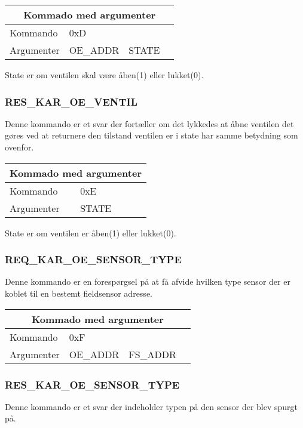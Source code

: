 \begin{table}[H]
\setlength{\parindent}{12pt}
\begin{tabular}{|l|lcc|}
\hline
\multicolumn{4}{|c|}{Kommado med argumenter}\\\hline
Kommando & 0xD & & \\
Argumenter & OE\_ADDR & STATE & \\\hline
\end{tabular}
\end{table}

State er om ventilen skal være åben(1) eller lukket(0).

\subsubsection{RES\_KAR\_OE\_VENTIL}
Denne kommando er et svar der fortæller om det lykkedes at åbne ventilen det gøres ved at returnere den tilstand ventilen er i state har samme betydning som ovenfor.

\begin{table}[H]
\setlength{\parindent}{12pt}
\begin{tabular}{|l|lcc|}
\hline
\multicolumn{4}{|c|}{Kommado med argumenter}\\\hline
Kommando & 0xE & & \\
Argumenter & STATE & & \\\hline
\end{tabular}
\end{table}

State er om ventilen er åben(1) eller lukket(0).

\subsubsection{REQ\_KAR\_OE\_SENSOR\_TYPE}
Denne kommando er en forespørgsel på at få afvide hvilken type sensor der er koblet til en bestemt fieldsensor adresse.

\begin{table}[H]
\setlength{\parindent}{12pt}
\begin{tabular}{|l|lcc|}
\hline
\multicolumn{4}{|c|}{Kommado med argumenter}\\\hline
Kommando & 0xF & & \\
Argumenter & OE\_ADDR & FS\_ADDR & \\\hline
\end{tabular}
\end{table}


\subsubsection{RES\_KAR\_OE\_SENSOR\_TYPE}
Denne kommando er et svar der indeholder typen på den sensor der blev spurgt på.

